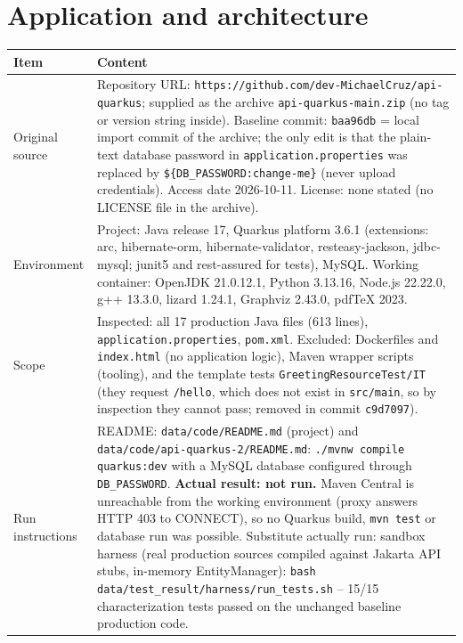 \documentclass[11pt,a4paper]{article}
\begin{document}
\section{Application and architecture}
{\small
\begin{center}\begin{tabular}{@{}p{3cm}p{12.7cm}@{}}
\toprule \textbf{Item} & \textbf{Content} \\ \midrule
Original source & Repository URL: \texttt{https:\allowbreak{}/\allowbreak{}/\allowbreak{}github.\allowbreak{}com/\allowbreak{}dev-MichaelCruz/\allowbreak{}api-quarkus}; supplied as the archive \texttt{api-quarkus-main.\allowbreak{}zip} (no tag or version string inside). Baseline commit: \texttt{baa96db} = local import commit of the archive; the only edit is that the plain-text database password in \texttt{application.\allowbreak{}properties} was replaced by \texttt{\$\{DB\_\allowbreak{}PASSWORD:\allowbreak{}change-me\}} (never upload credentials). Access date 2026-10-11. License: none stated (no LICENSE file in the archive). \\
Environment & Project: Java release 17, Quarkus platform 3.6.1 (extensions: arc, hibernate-orm, hibernate-validator, resteasy-jackson, jdbc-mysql; junit5 and rest-assured for tests), MySQL. Working container: OpenJDK 21.0.12.1, Python 3.13.16, Node.js 22.22.0, g++ 13.3.0, lizard 1.24.1, Graphviz 2.43.0, pdfTeX 2023. \\
Scope & Inspected: all 17 production Java files (613 lines), \texttt{application.\allowbreak{}properties}, \texttt{pom.\allowbreak{}xml}. Excluded: Dockerfiles and \texttt{index.\allowbreak{}html} (no application logic), Maven wrapper scripts (tooling), and the template tests \texttt{GreetingResourceTest/\allowbreak{}IT} (they request \texttt{/\allowbreak{}hello}, which does not exist in \texttt{src/\allowbreak{}main}, so by inspection they cannot pass; removed in commit \texttt{c9d7097}). \\
Run instructions & README: \texttt{data/\allowbreak{}code/\allowbreak{}README.\allowbreak{}md} (project) and \texttt{data/\allowbreak{}code/\allowbreak{}api-quarkus-2/\allowbreak{}README.\allowbreak{}md}: \texttt{.\allowbreak{}/\allowbreak{}mvnw compile quarkus:\allowbreak{}dev} with a MySQL database configured through \texttt{DB\_\allowbreak{}PASSWORD}. \textbf{Actual result: not run.} Maven Central is unreachable from the working environment (proxy answers HTTP 403 to CONNECT), so no Quarkus build, \texttt{mvn test} or database run was possible. Substitute actually run: sandbox harness (real production sources compiled against Jakarta API stubs, in-memory EntityManager): \texttt{bash data/\allowbreak{}test\_\allowbreak{}result/\allowbreak{}harness/\allowbreak{}run\_\allowbreak{}tests.\allowbreak{}sh} -- 15/15 characterization tests passed on the unchanged baseline production code. \\
\bottomrule\end{tabular}\end{center}
}
\end{document}
